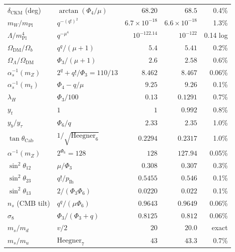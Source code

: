 \documentclass[11pt]{article}
\newcommand{\mPl}{m_{\mathrm{Pl}}}
\begin{document}
\begin{center}
\begin{tabular}{llrrr}
$\delta_{\mathrm{CKM}}$ (deg) & $\arctan(\Phi_4/\mu)$         & $68.20$   & $68.5$    & 0.4\% \\
$m_W/\mPl$                  & $q^{-(q!)^2}$                    & $6.7\!\times\!10^{-18}$ & $6.6\!\times\!10^{-18}$ & 1.3\% \\
$\Lambda/\mPl^4$            & $q^{-\mu^4}$                     & $10^{-122.14}$ & $10^{-122}$ & 0.14 log \\
$\Omega_{\mathrm{DM}}/\Omega_b$ & $q^q/(\mu+1)$                  & $5.4$     & $5.41$    & 0.2\% \\
$\Omega_\Lambda/\Omega_{\mathrm{DM}}$ & $\Phi_3/(\mu+1)$        & $2.6$     & $2.58$    & 0.6\% \\
$\alpha_s^{-1}(m_Z)$       & $2^q + q!/\Phi_3 = 110/13$    & $8.462$   & $8.467$   & 0.06\% \\
$\alpha_s^{-1}(m_t)$       & $\Phi_4 - q/\mu$                & $9.25$    & $9.26$    & 0.1\% \\
$\lambda_H$                & $\Phi_3/100$                    & $0.13$    & $0.1291$  & 0.7\% \\
$y_t$                       & $1$                              & $1$       & $0.992$   & 0.8\% \\
$y_b/y_\tau$               & $\Phi_6/q$                       & $2.33$    & $2.35$    & 1.0\% \\
$\tan\theta_{\mathrm{Cab}}$ & $1/\sqrt{\mathrm{Heegner}_6}$  & $0.2294$  & $0.2317$  & 1.0\% \\
$\alpha^{-1}(m_Z)$         & $2^{\Phi_6} = 128$              & $128$     & $127.94$  & 0.05\% \\
$\sin^2\theta_{12}$        & $\mu/\Phi_3$                     & $0.308$   & $0.307$   & 0.3\% \\
$\sin^2\theta_{23}$        & $q!/p_{\mathrm{Ih}}$            & $0.5455$  & $0.546$   & 0.1\% \\
$\sin^2\theta_{13}$        & $2/(\Phi_3\Phi_6)$              & $0.0220$  & $0.022$   & 0.1\% \\
$n_s$ (CMB tilt)           & $q^q/(\mu\Phi_6)$               & $0.9643$  & $0.9649$  & 0.06\% \\
$\sigma_8$                  & $\Phi_3/(\Phi_3+q)$            & $0.8125$  & $0.812$   & 0.06\% \\
$m_s/m_d$                  & $v/2$                            & $20$      & $20.0$    & exact \\
$m_s/m_u$                  & $\mathrm{Heegner}_7$            & $43$      & $43.3$    & 0.7\% \\

\end{tabular}
\end{center}
\end{document}
